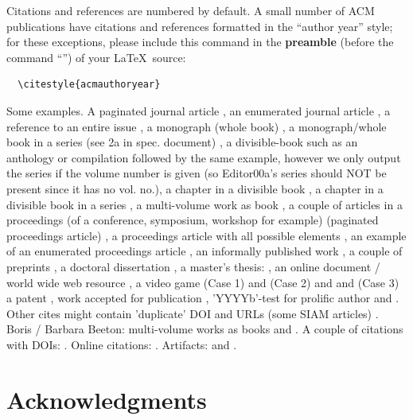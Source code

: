 Citations and references are numbered by default. A small number of
ACM publications have citations and references formatted in the
``author year'' style; for these exceptions, please include this
command in the {\bfseries preamble} (before the command
``\verb||'') of your \LaTeX\ source:
\begin{verbatim}
  \citestyle{acmauthoryear}
\end{verbatim}


  Some examples.  A paginated journal article \cite{Abril07}, an
  enumerated journal article \cite{Cohen07}, a reference to an entire
  issue \cite{JCohen96}, a monograph (whole book) \cite{Kosiur01}, a
  monograph/whole book in a series (see 2a in spec. document)
  \cite{Harel79}, a divisible-book such as an anthology or compilation
  \cite{Editor00} followed by the same example, however we only output
  the series if the volume number is given \cite{Editor00a} (so
  Editor00a's series should NOT be present since it has no vol. no.),
  a chapter in a divisible book \cite{Spector90}, a chapter in a
  divisible book in a series \cite{Douglass98}, a multi-volume work as
  book \cite{Knuth97}, a couple of articles in a proceedings (of a
  conference, symposium, workshop for example) (paginated proceedings
  article) \cite{Andler79, Hagerup1993}, a proceedings article with
  all possible elements \cite{Smith10}, an example of an enumerated
  proceedings article \cite{VanGundy07}, an informally published work
  \cite{Harel78}, a couple of preprints \cite{Bornmann2019,
    AnzarootPBM14}, a doctoral dissertation \cite{Clarkson85}, a
  master's thesis: \cite{anisi03}, an online document / world wide web
  resource \cite{Thornburg01, Ablamowicz07, Poker06}, a video game
  (Case 1) \cite{Obama08} and (Case 2) \cite{Novak03} and \cite{Lee05}
  and (Case 3) a patent \cite{JoeScientist001}, work accepted for
  publication \cite{rous08}, 'YYYYb'-test for prolific author
  \cite{SaeediMEJ10} and \cite{SaeediJETC10}. Other cites might
  contain 'duplicate' DOI and URLs (some SIAM articles)
  \cite{Kirschmer:2010:AEI:1958016.1958018}. Boris / Barbara Beeton:
  multi-volume works as books \cite{MR781536} and \cite{MR781537}. A
  couple of citations with DOIs:
  \cite{2004:ITE:1009386.1010128,Kirschmer:2010:AEI:1958016.1958018}. Online
  citations: \cite{TUGInstmem, Thornburg01, CTANacmart}.
  Artifacts: \cite{R} and \cite{UMassCitations}.

\section{Acknowledgments}

